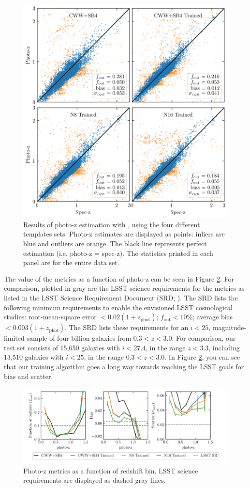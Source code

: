 \begin{figure}
    \centering
    \includegraphics{photoz_results.png}
    \caption{Results of photo-z estimation with \bpz, using the four different templates sets. Photo-z estimates are displayed as points: inliers are blue and outliers are orange. The black line represents perfect estimation (i.e. photo-z = spec-z). The statistics printed in each panel are for the entire data set.}
    \label{fig:photoz_results}
\end{figure}

The value of the metrics as a function of photo-z can be seen in Figure \ref{fig:photoz_binned}. For comparison, plotted in gray are the LSST science requirements for the metrics as listed in the LSST Science Requirement Document (SRD; \citealt{Ivezic2018}).
The SRD lists the following minimum requirements to enable the envisioned LSST cosmological studies: root-mean-square error $< 0.02(1+z_\text{phot})$; $f_\text{out} < 10\%$; average bias $<0.003(1+z_\text{phot})$.
The SRD lists these requirements for an $i<25$, magnitude-limited sample of four billion galaxies from $0.3 < z < 3.0$.
For comparison, our test set consists of 15,650 galaxies with $i < 27.4$, in the range $z < 3.3$, including 13,510 galaxies with $i < 25$, in the range $0.3 < z < 3.0$.
In Figure \ref{fig:photoz_binned}, you can see that our training algorithm goes a long way towards reaching the LSST goals for bias and scatter.

\begin{figure}
    \centering
    \includegraphics{figures/photoz_binned_metrics.pdf}
    \caption{Photo-z metrics as a function of redshift bin. LSST science requirements are displayed as dashed gray lines.}
    \label{fig:photoz_binned}
\end{figure}